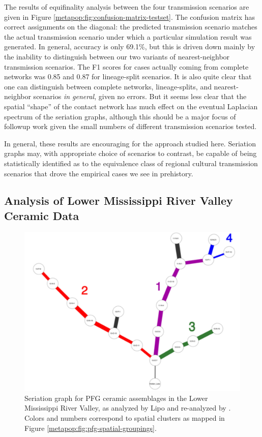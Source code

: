     The results of equifinality analysis between the four transmission scenarios are given in Figure \ref{metapop:fig:confusion-matrix-testset}.  The confusion matrix has correct assignments on the diagonal:  the predicted transmission scenario matches the actual transmission scenario under which a particular simulation result was generated.  In general, accuracy is only 69.1\%, but this is driven down mainly by the inability to distinguish between our two variants of nearest-neighbor transmission scenarios.  The F1 scores for cases actually coming from complete networks was 0.85 and 0.87 for lineage-split scenarios.  It is also quite clear that one can distinguish between complete networks, lineage-splits, and nearest-neighbor scenarios \emph{in general}, given no errors. But it seems less clear that the spatial ``shape'' of the contact network has much effect on the eventual Laplacian spectrum of the seriation graphs, although this should be a major focus of followup work given the small numbers of different transmission scenarios tested.  
    
    In general, these results are encouraging for the approach studied here.  Seriation graphs may, with appropriate choice of scenarios to contrast, be capable of being statistically identified as to the equivalence class of regional cultural transmission scenarios that drove the empirical cases we see in prehistory. 
    
    \subsection{Analysis of Lower Mississippi River Valley Ceramic Data}\label{metapop:sec:results-lmv}
    
    \begin{figure}[ht]
    \centering
    \includegraphics[scale=0.5]{graphics/multipleseriation/pfg-seriation-graph-minmax.pdf}
    \caption{Seriation graph for PFG \citeyearpar{PFG1951} ceramic assemblages in 
    the Lower Mississippi River Valley, as analyzed by Lipo \citeyearpar{Lipo2001a} and re-analyzed by \citet{Lipo2015}. Colors and numbers correspond to spatial clusters as mapped in Figure \ref{metapop:fig:pfg-spatial-groupings}.}
    \label{metapop:fig:pfg-seriation-graphs}
    \end{figure}
    
